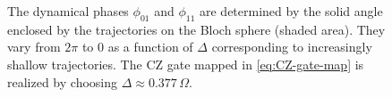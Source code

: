 \documentclass[rmp,10pt,onecolumn,fleqn,notitlepage]{revtex4-1}
\begin{document}
    \begin{figure}[h!]
    \begin{minipage}[c]{0.49\linewidth}
    \centering
    \end{minipage}
    \begin{minipage}[]{0.49\linewidth}
    \centering
    \end{minipage}
    \caption{The dynamical phases $\phi_{01}$ and $\phi_{11}$ are determined by the solid angle enclosed by the trajectories on the Bloch sphere (shaded area). They vary from $2\pi$ to 0 as a function of $\Delta$ corresponding to increasingly shallow trajectories. The CZ gate mapped in \eqref{eq:CZ-gate-map} is realized by choosing $\Delta \approx 0.377 \, \Omega$. }
    \label{fig:dynamical-phase}
    \end{figure}
 
\clearpage
 
\end{document}
